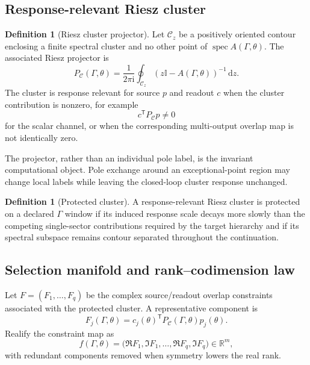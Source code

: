 \documentclass[11pt]{article}
\theoremstyle{definition}
\newtheorem{definition}[theorem]{Definition}
\theoremstyle{remark}
\DeclareMathOperator{\spec}{spec}
\newcommand{\dd}{\,\mathrm d}
\newcommand{\ii}{\mathrm i}
\newcommand{\id}{\mathbb I}
\newcommand{\cC}{\mathcal C}
\newcommand{\RR}{\mathbb R}
\begin{document}
\subsection{Response-relevant Riesz cluster}

\begin{definition}[Riesz cluster projector]\label{def:riesz-projector}
Let $\cC_z$ be a positively oriented contour enclosing a finite spectral cluster and no other point of $\spec A(\Gamma,\theta)$. The associated Riesz projector is
\begin{equation}
P_{\cC}(\Gamma,\theta)
=
\frac{1}{2\pi\ii}
\oint_{\cC_z}
(z\id-A(\Gamma,\theta))^{-1}\dd z.
\label{eq:riesz-projector}
\end{equation}
The cluster is response relevant for source $p$ and readout $c$ when the cluster contribution is nonzero, for example
\begin{equation}
c^{\mathsf T}P_{\cC}p\neq0
\end{equation}
for the scalar channel, or when the corresponding multi-output overlap map is not identically zero.
\end{definition}

The projector, rather than an individual pole label, is the invariant computational object. Pole exchange around an exceptional-point region may change local labels while leaving the closed-loop cluster response unchanged.

\begin{definition}[Protected cluster]\label{def:protected-cluster}
A response-relevant Riesz cluster is protected on a declared $\Gamma$ window if its induced response scale decays more slowly than the competing single-sector contributions required by the target hierarchy and if its spectral subspace remains contour separated throughout the continuation.
\end{definition}

\subsection{Selection manifold and rank--codimension law}

Let $F=(F_1,\ldots,F_q)$ be the complex source/readout overlap constraints associated with the protected cluster. A representative component is
\begin{equation}
F_j(\Gamma,\theta)
=c_j(\theta)^{\mathsf T}
P_{\cC}(\Gamma,\theta)
p_j(\theta).
\label{eq:overlap-map}
\end{equation}
Realify the constraint map as
\begin{equation}
f(\Gamma,\theta)
=
\bigl(
\Re F_1,\Im F_1,\ldots,
\Re F_q,\Im F_q
\bigr)
\in\RR^m,
\label{eq:realified-selection-map}
\end{equation}
with redundant components removed when symmetry lowers the real rank.
\end{document}
